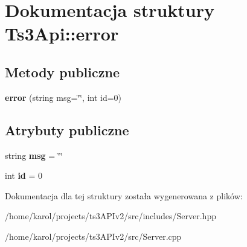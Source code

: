 \hypertarget{struct_ts3_api_1_1error}{}\section{Dokumentacja struktury Ts3\+Api\+:\+:error}
\label{struct_ts3_api_1_1error}
\subsection*{Metody publiczne}
\begin{DoxyCompactItemize}
\item 
{\bfseries error} (string msg=\char`\"{}\char`\"{}, int id=0)\hypertarget{struct_ts3_api_1_1error_a03255b3eab76cd950fdfb4ec843cbec6}{}\label{struct_ts3_api_1_1error_a03255b3eab76cd950fdfb4ec843cbec6}

\end{DoxyCompactItemize}
\subsection*{Atrybuty publiczne}
\begin{DoxyCompactItemize}
\item 
string {\bfseries msg} = \char`\"{}\char`\"{}\hypertarget{struct_ts3_api_1_1error_ac72761d3bd826d444d0d342a27b64f68}{}\label{struct_ts3_api_1_1error_ac72761d3bd826d444d0d342a27b64f68}

\item 
int {\bfseries id} = 0\hypertarget{struct_ts3_api_1_1error_a3c86d7bb5a4db46e71b00c78c482c6b9}{}\label{struct_ts3_api_1_1error_a3c86d7bb5a4db46e71b00c78c482c6b9}

\end{DoxyCompactItemize}


Dokumentacja dla tej struktury została wygenerowana z plików\+:\begin{DoxyCompactItemize}
\item 
/home/karol/projects/ts3\+A\+P\+Iv2/src/includes/Server.\+hpp\item 
/home/karol/projects/ts3\+A\+P\+Iv2/src/Server.\+cpp\end{DoxyCompactItemize}
